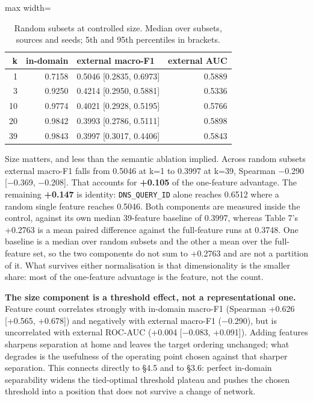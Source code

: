 \documentclass[preprint,12pt,nopreprintline]{elsarticle}
\begin{document}
\begin{table}[htbp]\centering\scriptsize
\caption{Random subsets at controlled size. Median over subsets, sources and seeds; 5th and 95th percentiles in brackets.}
\begin{adjustbox}{max width=\textwidth}\begin{tabular}{rrlr}
\toprule
k & in-domain & external macro-F1 & external AUC \\
\midrule
1 & 0.7158 & 0.5046 [0.2835, 0.6973] & 0.5889 \\
3 & 0.9250 & 0.4214 [0.2950, 0.5881] & 0.5336 \\
10 & 0.9774 & 0.4021 [0.2928, 0.5195] & 0.5766 \\
20 & 0.9842 & 0.3993 [0.2786, 0.5111] & 0.5898 \\
39 & 0.9843 & 0.3997 [0.3017, 0.4406] & 0.5843 \\
\bottomrule
\end{tabular}\end{adjustbox}
\end{table}

Size matters, and less than the semantic ablation implied. Across random subsets external macro-F1 falls from 0.5046 at k=1 to 0.3997 at k=39, Spearman $-$0.290 [$-$0.369, $-$0.208]. That accounts for \textbf{+0.105} of the one-feature advantage. The remaining \textbf{+0.147} is identity: \texttt{DNS\_QUERY\_ID} alone reaches 0.6512 where a random single feature reaches 0.5046. Both components are measured inside the control, against its own median 39-feature baseline of 0.3997, whereas Table 7's +0.2763 is a mean paired difference against the full-feature runs at 0.3748. One baseline is a median over random subsets and the other a mean over the full-feature set, so the two components do not sum to +0.2763 and are not a partition of it. What survives either normalisation is that dimensionality is the smaller share: most of the one-feature advantage is the feature, not the count.

\textbf{The size component is a threshold effect, not a representational one.} Feature count correlates strongly with in-domain macro-F1 (Spearman +0.626 [+0.565, +0.678]) and negatively with external macro-F1 ($-$0.290), but is uncorrelated with external ROC-AUC (+0.004 [$-$0.083, +0.091]). Adding features sharpens separation at home and leaves the target ordering unchanged; what degrades is the usefulness of the operating point chosen against that sharper separation. This connects directly to \S{}4.5 and to \S{}3.6: perfect in-domain separability widens the tied-optimal threshold plateau and pushes the chosen threshold into a position that does not survive a change of network.
\end{document}
